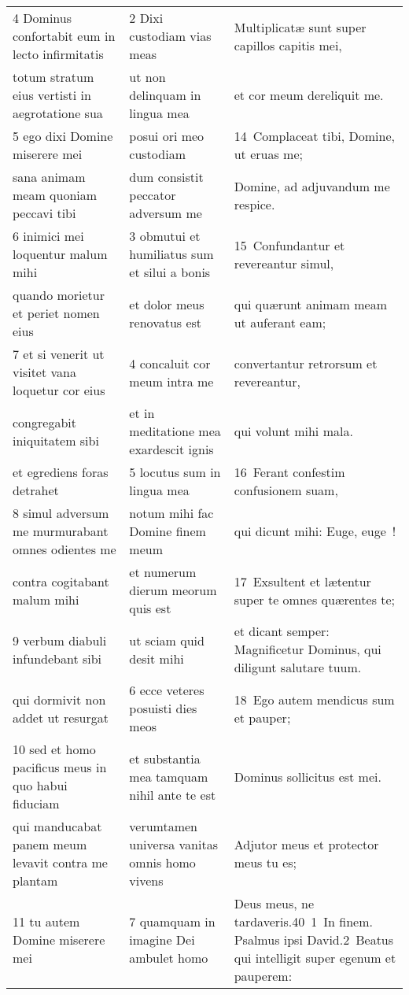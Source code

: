 \documentclass{article}
\begin{document}
\begin{longtable}{@{}p{}p{}p{}@{}}
4 Dominus confortabit eum in lecto infirmitatis	&	2 Dixi custodiam vias meas	&	Multiplicatæ sunt super capillos capitis mei,	\\
totum stratum eius vertisti in aegrotatione sua	&	ut non delinquam in lingua mea	&	et cor meum dereliquit me.	\\
5 ego dixi Domine miserere mei	&	posui ori meo custodiam	&	14 Complaceat tibi, Domine, ut eruas me;	\\
sana animam meam quoniam peccavi tibi	&	dum consistit peccator adversum me	&	Domine, ad adjuvandum me respice.	\\
6 inimici mei loquentur malum mihi	&	3 obmutui et humiliatus sum et silui a bonis	&	15 Confundantur et revereantur simul,	\\
quando morietur et periet nomen eius	&	et dolor meus renovatus est	&	qui quærunt animam meam ut auferant eam;	\\
7 et si venerit ut visitet vana loquetur cor eius	&	4 concaluit cor meum intra me	&	convertantur retrorsum et revereantur,	\\
congregabit iniquitatem sibi	&	et in meditatione mea exardescit ignis	&	qui volunt mihi mala.	\\
et egrediens foras detrahet	&	5 locutus sum in lingua mea	&	16 Ferant confestim confusionem suam,	\\
8 simul adversum me murmurabant omnes odientes me	&	notum mihi fac Domine finem meum	&	qui dicunt mihi: Euge, euge !	\\
contra cogitabant malum mihi	&	et numerum dierum meorum quis est	&	17 Exsultent et lætentur super te omnes quærentes te;	\\
9 verbum diabuli infundebant sibi	&	ut sciam quid desit mihi	&	et dicant semper: Magnificetur Dominus, qui diligunt salutare tuum.	\\
qui dormivit non addet ut resurgat	&	6 ecce veteres posuisti dies meos	&	18 Ego autem mendicus sum et pauper;	\\
10 sed et homo pacificus meus in quo habui fiduciam	&	et substantia mea tamquam nihil ante te est	&	Dominus sollicitus est mei.	\\
qui manducabat panem meum levavit contra me plantam	&	verumtamen universa vanitas omnis homo vivens	&	Adjutor meus et protector meus tu es;	\\
11 tu autem Domine miserere mei	&	7 quamquam in imagine Dei ambulet homo	&	Deus meus, ne tardaveris.40 1 In finem. Psalmus ipsi David.2 Beatus qui intelligit super egenum et pauperem:	\\

\end{longtable}
\end{document}
